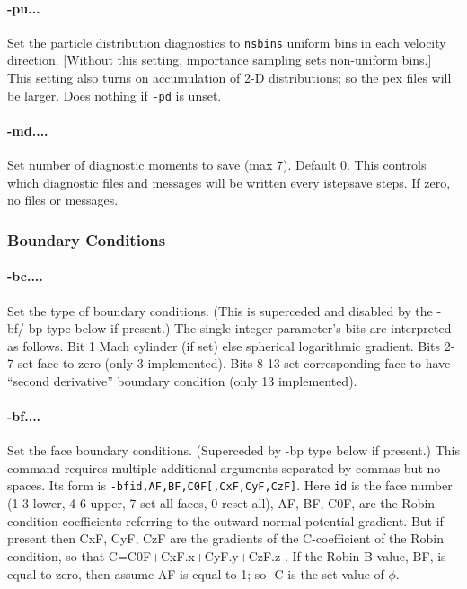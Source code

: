 \documentclass[12pt]{article}
\begin{document}
\paragraph{-pu...}
Set the particle distribution diagnostics to \verb!nsbins! uniform
bins in each velocity direction. [Without this setting, importance
sampling sets non-uniform bins.] This setting also turns on
accumulation of 2-D distributions; so the pex files will be larger.
Does nothing if \verb!-pd! is unset.

\paragraph{-md....}  Set number of diagnostic moments to save (max 7). Default 0.
This controls which diagnostic files and messages will be written
every istepsave steps. If zero, no files or messages.

\subsubsection*{Boundary Conditions}

\paragraph{-bc....} Set the type of boundary conditions. (This is
superceded and disabled by the -bf/-bp type below if present.) The single
integer parameter's bits are interpreted as follows.  Bit 1 Mach
cylinder (if set) else spherical logarithmic gradient.  Bits 2-7 set
face to zero (only 3 implemented). Bits 8-13 set corresponding face to
have ``second derivative'' boundary condition (only 13 implemented).

\paragraph{-bf....} Set the face boundary conditions. (Superceded by
-bp type below if present.) This command requires multiple additional
arguments separated by commas but no spaces. Its form is
\verb!-bfid,AF,BF,C0F[,CxF,CyF,CzF]!. Here \verb!id! is the face
number (1-3 lower, 4-6 upper, 7 set all faces, 0 reset all), AF, BF,
C0F, are the Robin condition coefficients referring to the outward
normal potential gradient. But if present then CxF, CyF, CzF are the
gradients of the C-coefficient of the Robin condition, so that
C=C0F+CxF.x+CyF.y+CzF.z . If the Robin B-value, BF, is equal to zero,
then assume AF is equal to 1; so -C is the set value of $\phi$.
\end{document}
